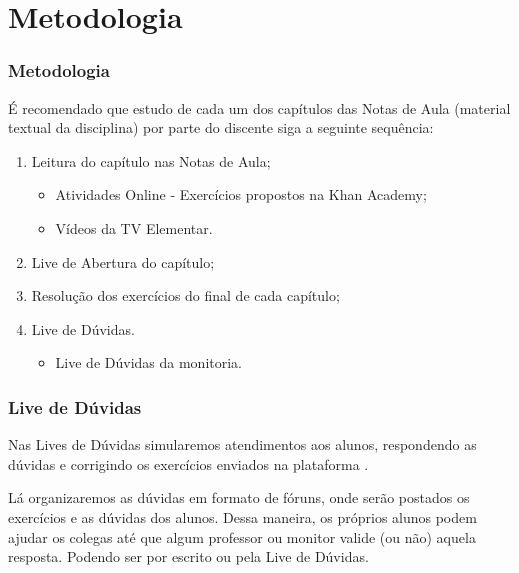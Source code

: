 \section{Metodologia}


\begin{frame}
	\frametitle{Metodologia}

	É recomendado que estudo de cada um dos capítulos das Notas de Aula (material textual da disciplina) por parte do discente siga a seguinte sequência:

	\begin{enumerate}
		\item Leitura do capítulo nas Notas de Aula;
		\begin{itemize}
			\item Atividades Online - Exercícios propostos na Khan Academy;
			\item Vídeos da TV Elementar.
		\end{itemize} \pause
		\item Live de Abertura do capítulo; \pause
		\item Resolução dos exercícios do final de cada capítulo; \pause
		\item Live de Dúvidas.
		\begin{itemize}
			\item Live de Dúvidas da monitoria.
		\end{itemize}
	\end{enumerate}

\end{frame}


\begin{frame}
	\frametitle{Live de Dúvidas} 

	Nas Lives de Dúvidas simularemos atendimentos aos alunos, respondendo as dúvidas e corrigindo os exercícios enviados na plataforma .

	Lá organizaremos as dúvidas em formato de fóruns, onde serão postados os exercícios e as dúvidas dos alunos. Dessa maneira, os próprios alunos podem ajudar os colegas até que algum professor ou monitor valide (ou não) aquela resposta. Podendo ser por escrito ou pela Live de Dúvidas.
\end{frame}
